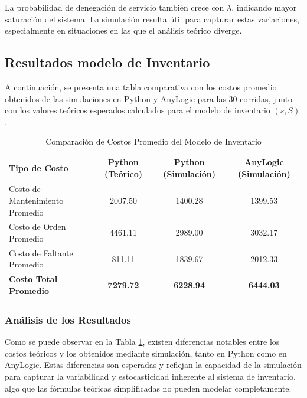 \documentclass{article}
\begin{document}
La probabilidad de denegación de servicio también crece con $\lambda$, indicando mayor saturación del sistema. La simulación resulta útil para capturar estas variaciones, especialmente en situaciones en las que el análisis teórico diverge.




\subsection{Resultados modelo de Inventario}
A continuación, se presenta una tabla comparativa con los costos promedio obtenidos de las simulaciones en Python y AnyLogic para las 30 corridas, junto con los valores teóricos esperados calculados para el modelo de inventario $(s,S)$.


\begin{table}[h!]
\centering
\caption{Comparación de Costos Promedio del Modelo de Inventario}
\label{tab:inventario_resultados}
\begin{tabular}{l c c c}
\toprule
\textbf{Tipo de Costo} & \textbf{Python (Teórico)} & \textbf{Python (Simulación)} & \textbf{AnyLogic (Simulación)} \\
\midrule
Costo de Mantenimiento Promedio & 2007.50 & 1400.28 & 1399.53 \\
Costo de Orden Promedio & 4461.11 & 2989.00 & 3032.17 \\
Costo de Faltante Promedio & 811.11 & 1839.67 & 2012.33 \\
\midrule
\textbf{Costo Total Promedio} & \textbf{7279.72} & \textbf{6228.94} & \textbf{6444.03} \\
\bottomrule
\end{tabular}
\end{table}


\subsubsection*{Análisis de los Resultados}
Como se puede observar en la Tabla \ref{tab:inventario_resultados}, existen diferencias notables entre los costos teóricos y los obtenidos mediante simulación, tanto en Python como en AnyLogic. Estas diferencias son esperadas y reflejan la capacidad de la simulación para capturar la variabilidad y estocasticidad inherente al sistema de inventario, algo que las fórmulas teóricas simplificadas no pueden modelar completamente.
\end{document}
